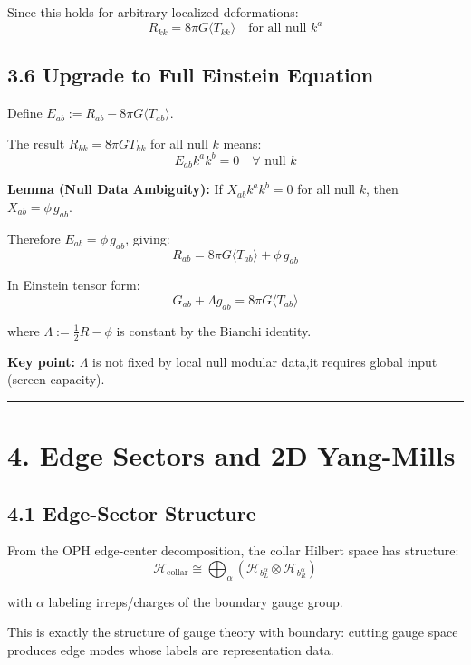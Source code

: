 Since this holds for arbitrary localized deformations: \[R_{kk} = 8\pi G \langle T_{kk} \rangle \quad \text{for all null } k^a\]

\subsection{3.6 Upgrade to Full Einstein Equation}\label{36-upgrade-to-full-einstein-equation}

Define \(E_{ab} := R_{ab} - 8\pi G \langle T_{ab} \rangle\).

The result \(R_{kk} = 8\pi G T_{kk}\) for all null \(k\) means: \[E_{ab} k^a k^b = 0 \quad \forall \text{ null } k\]

\textbf{Lemma (Null Data Ambiguity):} If \(X_{ab} k^a k^b = 0\) for all null \(k\), then \(X_{ab} = \phi \, g_{ab}\).

Therefore \(E_{ab} = \phi \, g_{ab}\), giving: \[R_{ab} = 8\pi G \langle T_{ab} \rangle + \phi \, g_{ab}\]

In Einstein tensor form: \[\boxed{G_{ab} + \Lambda g_{ab} = 8\pi G \langle T_{ab} \rangle}\]

where \(\Lambda := \frac{1}{2}R - \phi\) is constant by the Bianchi identity.

\textbf{Key point:} \(\Lambda\) is not fixed by local null modular data,it requires global input (screen capacity).

\begin{center}\rule{0.5\linewidth}{0.5pt}\end{center}

\section{4. Edge Sectors and 2D Yang-Mills}\label{4-edge-sectors-and-2d-yang-mills}

\subsection{4.1 Edge-Sector Structure}\label{41-edge-sector-structure}

From the OPH edge-center decomposition, the collar Hilbert space has structure: \[\mathcal{H}_{\text{collar}} \cong \bigoplus_{\alpha} \left(\mathcal{H}_{b_L^\alpha} \otimes \mathcal{H}_{b_R^\alpha}\right)\]

with \(\alpha\) labeling irreps/charges of the boundary gauge group.

This is exactly the structure of gauge theory with boundary: cutting gauge space produces edge modes whose labels are representation data.

